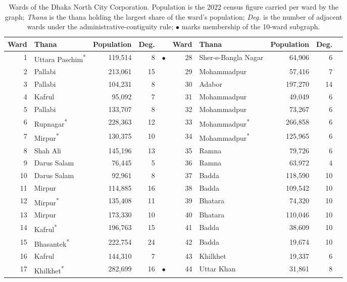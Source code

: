 \begin{table}[htbp]
\centering\footnotesize
\caption{Wards of the Dhaka North City Corporation. Population is the 2022 census figure carried per ward by the graph; \emph{Thana} is the thana holding the largest share of the ward's population; \emph{Deg.} is the number of adjacent wards under the administrative-contiguity rule; $\bullet$ marks membership of the 10-ward subgraph.}
\label{tab:wards}
\begin{tabular}{@{}rlrrc@{\hspace{1.2em}}rlrrc@{}}
\toprule
Ward & Thana & Population & Deg. &  & Ward & Thana & Population & Deg. &  \\
\midrule
1 & Uttara Paschim\textsuperscript{*} & 119,514 & 8 & $\bullet$ & 28 & Sher-e-Bangla Nagar & 64,906 & 6 &  \\
2 & Pallabi & 213,061 & 15 &  & 29 & Mohammadpur & 57,416 & 7 &  \\
3 & Pallabi & 104,231 & 8 &  & 30 & Adabor & 197,270 & 14 &  \\
4 & Kafrul & 95,092 & 7 &  & 31 & Mohammadpur & 49,049 & 6 &  \\
5 & Pallabi & 133,707 & 8 &  & 32 & Mohammadpur & 73,267 & 6 &  \\
6 & Rupnagar\textsuperscript{*} & 228,363 & 12 &  & 33 & Mohammadpur\textsuperscript{*} & 266,858 & 6 &  \\
7 & Mirpur\textsuperscript{*} & 130,375 & 10 &  & 34 & Mohammadpur\textsuperscript{*} & 125,965 & 6 &  \\
8 & Shah Ali & 145,196 & 13 &  & 35 & Ramna & 79,726 & 6 &  \\
9 & Darus Salam & 76,445 & 5 &  & 36 & Ramna & 63,972 & 4 &  \\
10 & Darus Salam & 92,961 & 8 &  & 37 & Badda & 118,590 & 10 &  \\
11 & Mirpur & 114,885 & 16 &  & 38 & Badda & 109,542 & 10 &  \\
12 & Mirpur\textsuperscript{*} & 135,408 & 11 &  & 39 & Bhatara & 74,320 & 10 &  \\
13 & Mirpur & 173,330 & 10 &  & 40 & Bhatara & 110,046 & 10 &  \\
14 & Kafrul\textsuperscript{*} & 196,763 & 15 &  & 41 & Badda & 38,609 & 10 &  \\
15 & Bhasantek\textsuperscript{*} & 222,754 & 24 &  & 42 & Badda & 19,674 & 10 &  \\
16 & Kafrul & 144,310 & 7 &  & 43 & Khilkhet & 19,337 & 6 &  \\
17 & Khilkhet\textsuperscript{*} & 282,699 & 16 & $\bullet$ & 44 & Uttar Khan & 31,861 & 8 &  \\

\end{tabular}
\end{table}
